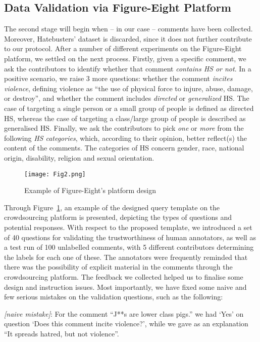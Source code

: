 \documentclass{article}
\begin{document}
\subsection{Data Validation via Figure-Eight Platform}
The second stage will begin when  -- in our case  -- comments have been collected. Moreover, Hatebusters' dataset is discarded, since it does not further contribute to our protocol. After a number of different experiments on the Figure-Eight platform, we settled on the next process. Firstly, given a specific comment, we ask the contributors to identify whether that comment \textit{contains HS or not}. In a positive scenario, we raise 3 more questions: whether the comment \textit{incites violence}, defining violence as ``the use of physical force to injure, abuse, damage, or destroy'', and whether the comment includes \textit{directed} or \textit{generalized} HS. The case of targeting a single person or a small group of people is defined as directed HS, whereas the case of targeting a class/large group of people is described as generalised HS. Finally, we ask the contributors to pick \textit{one} or \textit{more} from the following \textit{HS categories}, which, according to their opinion, better reflect(s) the content of the comments. The categories of HS concern gender, race, national origin, disability, religion and sexual orientation.

\begin{figure}[ht]
\centering
\texttt{[image: Fig2.png]}
\caption{Example of Figure-Eight's platform design}
\label{fig:figureEightExample}
\end{figure}

Through Figure~\ref{fig:figureEightExample}, an example of the designed query template on the crowdsourcing platform is presented, depicting the types of questions and potential responses. With respect to the proposed template, we introduced a set of 40 questions for validating the trustworthiness of human annotators, as well as a test run of 100 unlabelled comments, with 5 different contributors determining the labels for each one of these. The annotators were frequently reminded that there was the possibility of explicit material in the comments through the crowdsourcing platform. The feedback we collected helped us to finalise some design and instruction issues. Most importantly, we have fixed some naive and few serious mistakes on the validation questions, such as the following:

\textit{[naive mistake]}: For the comment ``J**s are lower class pigs.'' we had `Yes' on question `Does this comment incite violence?', while we gave as an explanation ``It spreads hatred, but not violence''.
\end{document}

